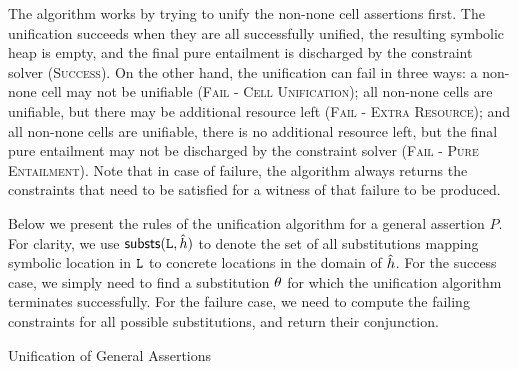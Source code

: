 The algorithm works by trying to unify the non-none cell assertions first. 
The unification succeeds when they are all successfully unified, the resulting symbolic heap is empty, 
and the final pure entailment is discharged by the constraint solver (\textsc{Success}). 
On the other hand, the unification can fail in three
ways: 
a non-none cell may not be unifiable (\textsc{Fail - Cell Unification}); 
all non-none cells are unifiable, but there may be additional resource left (\textsc{Fail - Extra Resource}); 
and all non-none cells are unifiable, there is no additional resource left, but the final
pure entailment may not be discharged by the constraint solver (\textsc{Fail - Pure Entailment}). 
Note that in case of failure, the algorithm 
always returns the constraints that need to be satisfied for a witness of that failure to be produced. 

Below we present the rules of the unification algorithm for a general assertion $P$.
For clarity, we use ${\sf substs}(\mathtt{L}, \hat{h})$ to denote the set of all substitutions
mapping symbolic location in $\mathtt{L}$ to concrete locations in the domain of $\hat{h}$. 
%
For the success case, we simply need to find a substitution $\theta$ 
for which the unification algorithm terminates successfully. For the failure case, 
we need to compute the failing constraints for all possible substitutions, and 
return their conjunction. 


\begin{display}{Unification of General Assertions}
 
 \\
 

 \end{display}

